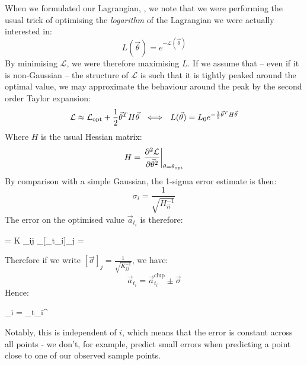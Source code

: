 \documentclass[]{article}
\def\ai{\vec{a}_{t_i}}
\begin{document}
			When we formulated our Lagrangian, , we note that we were performing the usual trick of optimising the \textit{logarithm} of the Lagrangian we were actually interested in:
			\begin{equation}
				L(\vec{\theta}) = e^{-\mathcal{L}(\vec{\theta})}
			\end{equation}
			By minimising $\mathcal{L}$, we were therefore maximising $L$. If we assume that -- even if it is non-Gaussian -- the structure of $\mathcal{L}$ is such that it is tightly peaked around the optimal value, we may approximate the behaviour around the peak by the second order Taylor expansion:
			\begin{equation}
				\mathcal{L} \approx \mathcal{L}_\text{opt} + \frac{1}{2}\vec{\theta}^T H \vec{\theta} ~~\Longleftrightarrow~~ L(\vec{\theta}) = L_0 e^{-\frac{1}{2}\vec{\theta}^T H \vec{\theta}}
			\end{equation}
			Where $H$ is the usual Hessian matrix:
			\begin{equation}
				H = \left. \frac{\partial ^2 \mathcal{L}}{\partial \vec{\theta}^2} \right|_{\theta = \theta_\text{opt}}
			\end{equation}
			By comparison with a simple Gaussian, the 1-sigma error estimate is then:
			\begin{equation}
				\sigma_i = \frac{1}{\sqrt{H^{-1}_{ii}}}
			\end{equation}
			The error on the optimised value $\ai$ is therefore:
			\begin{spalign}
				\pdiv{^2\mathcal{L}}{\ai \partial {}_j} = K \delta_{ij} \LLR \sigma_{[\ai]_j} = 
			\end{spalign}
			Therefore if we write $[\vec{\sigma}]_j = \frac{1}{\sqrt{K^{-1}_{jj}}}$, we have:
			\begin{equation}
				\ai = \ai^{\text{clup}} \pm \vec{\sigma}
			\end{equation}
			Hence:
			\begin{spalign}
				_i = \ai^{}\cdot {} \pm \vec{\sigma} \cdot \vec{X}
			\end{spalign}
			Notably, this is independent of $i$, which means that the error is constant across all points - we don't, for example, predict small errors when predicting a point close to one of our  observed sample points.

\end{document}
